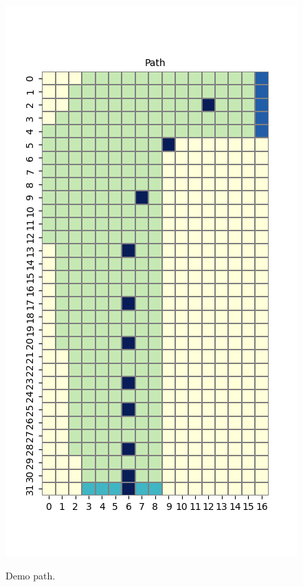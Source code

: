 \documentclass[11pt]{article}
\begin{document}
    \includegraphics[scale=0.7]{env2_demo_e_5_12_6}

    Demo path.
\end{document}
